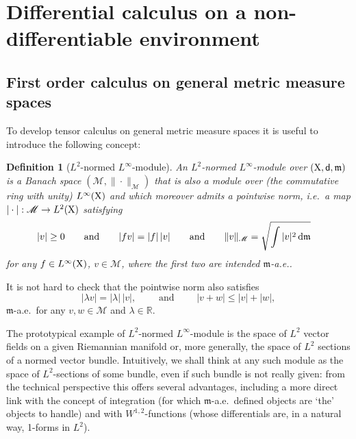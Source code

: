 \documentclass[11pt]{article}
\numberwithin{equation}{section}
\newtheorem{definition}[theorem]{Definition}
\newcommand{\R}{\mathbb{R}}
\newcommand{\X}{{\rm X}}
\newcommand{\sfd}{{\sf d}}
\newcommand{\mm}{{\mathfrak m}}
\renewcommand{\d}{{\rm d}}
\newcommand{\M}{\mathscr M}
\begin{document}
\section{Differential calculus on a non-differentiable environment}
\subsection{First order calculus on general metric measure spaces}\label{se:firstordercalc}
To develop tensor calculus on general metric measure spaces it is useful to introduce the following concept:
\begin{definition}[$L^2$-normed $L^\infty$-module]
An $L^2$-normed $L^\infty$-module over $(\X,\sfd,\mm)$ is a Banach space $(\M,\|\cdot\|_\M)$ that is also a module over (the commutative ring with unity) $L^\infty(\X)$ and which moreover admits a \emph{pointwise norm}, i.e.\ a map $|\cdot|:\M\to L^2(\X)$ satisfying
\[
\begin{split}
|v|&\geq 0\qquad\text{and}\qquad |fv|=|f|\,|v|\qquad\text{and}\qquad
\|v\|_\M=\sqrt{\int|v|^2\,\d\mm}
\end{split}
\]
for any $f\in L^\infty(\X)$, $v\in \M$, where the first two are intended $\mm$-a.e..
\end{definition}
It is not hard to check that the pointwise norm also satisfies
\[
|\lambda v|=|\lambda|\,|v|,\qquad\text{ and }\qquad |v+w|\leq |v|+|w|,
\]
$\mm$-a.e.\ for any $v,w\in \M$ and $\lambda\in\R$.

The prototypical example of $L^2$-normed $L^\infty$-module is the space of $L^2$ vector fields on a given Riemannian manifold or, more generally, the space of $L^2$ sections of a normed vector bundle. Intuitively, we shall  think at any such  module as the space of $L^2$-sections of some bundle, even if such bundle is not really given: from the technical perspective this offers several advantages, including a more direct link with the concept of integration (for which $\mm$-a.e.\ defined objects are `the' objects to handle) and with $W^{1,2}$-functions (whose differentials are, in a natural way, 1-forms in $L^2$).
\end{document}
